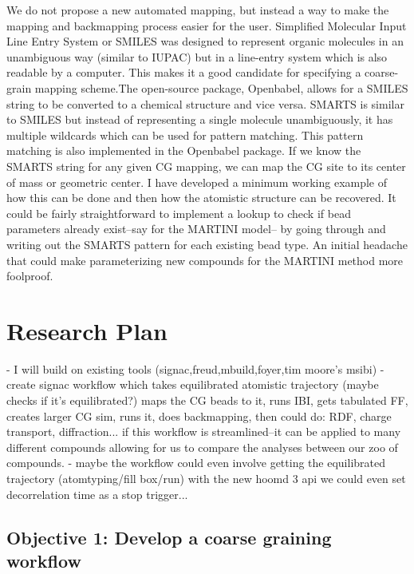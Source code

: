 We do not propose a new automated mapping, but instead a way to make the mapping and backmapping process easier for the user.
Simplified Molecular Input Line Entry System or SMILES was designed to represent organic molecules in an unambiguous way (similar to IUPAC) but in a line-entry system which is also readable by a computer\cite{Weininger}.
This makes it a good candidate for specifying a coarse-grain mapping scheme.The open-source package, Openbabel, allows for a SMILES string to be converted to a chemical structure and vice versa.
SMARTS is similar to SMILES but instead of representing a single molecule unambiguously, it has multiple wildcards which can be used for pattern matching.%
This pattern matching is also implemented in the Openbabel package.
If we know the SMARTS string for any given CG mapping, we can map the CG site to its center of mass or geometric center.
I have developed a minimum working example of how this can be done and then how the atomistic structure can be recovered.%
It could be fairly straightforward to implement a lookup to check if bead parameters already exist--say for the MARTINI model-- by going through and writing out the SMARTS pattern for each existing bead type.
An initial headache that could make parameterizing new compounds for the MARTINI method more foolproof.

\section*{Research Plan}

- I will build on existing tools (signac,freud,mbuild,foyer,tim moore's msibi)
- create signac workflow which takes equilibrated atomistic trajectory (maybe checks if it's equilibrated?) maps the CG beads to it, runs IBI, gets tabulated FF, creates larger CG sim, runs it, does backmapping, then could do: RDF, charge transport, diffraction...
if this workflow is streamlined--it can be applied to many different compounds allowing for us to compare the analyses between our zoo of compounds.
- maybe the workflow could even involve getting the equilibrated trajectory (atomtyping/fill box/run) with the new hoomd 3 api we could even set decorrelation time as a stop trigger...

\subsection*{Objective 1: Develop a coarse graining workflow}


